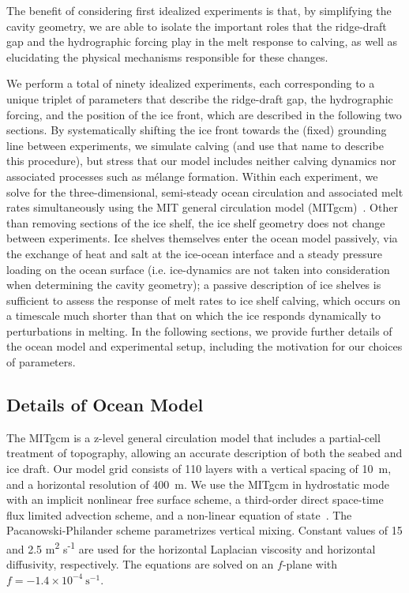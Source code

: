\documentclass[draft]{agujournal2019}
\begin{document}
The benefit of considering first idealized experiments is that, by simplifying the cavity geometry, we are able to isolate the important roles that the ridge-draft gap and the hydrographic forcing play in the melt response to calving, as well as elucidating the physical mechanisms responsible for these changes. 

We perform a total of ninety idealized experiments, each corresponding to a unique triplet of parameters that describe the ridge-draft gap, the hydrographic forcing, and the position of the ice front, which are described in the following two sections. By systematically shifting the ice front towards the (fixed) grounding line between experiments, we simulate calving (and use that name to describe this procedure), but stress that our model includes neither calving dynamics nor associated processes such as mélange formation. Within each experiment, we solve for the three-dimensional, semi-steady ocean circulation and associated melt rates simultaneously using the MIT general circulation model (MITgcm)~\cite{Marshall1997JGROceans}. Other than removing sections of the ice shelf, the ice shelf geometry does not change between experiments. Ice shelves themselves enter the ocean model passively, via the exchange of heat and salt at the ice-ocean interface and a steady pressure loading on the ocean surface (i.e. ice-dynamics are not taken into  consideration when determining the cavity geometry); a passive description of ice shelves is sufficient to assess the response of melt rates to ice shelf calving, which occurs on a timescale much shorter than that on which the ice responds dynamically to perturbations in melting. In the following sections, we provide further details of the ocean model and experimental setup, including the motivation for our choices of parameters.


\subsection{Details of Ocean Model}\label{S:Experiment:Model}
The MITgcm is a z-level general circulation model that includes a partial-cell treatment of topography, allowing an accurate description of both the seabed and ice draft. Our model grid consists of 110 layers with a vertical spacing of 10~m, and a horizontal resolution of 400~m. We use the MITgcm in hydrostatic mode with an implicit nonlinear free surface scheme, a third-order direct space-time flux limited advection scheme, and a non-linear equation of state~\cite{Mcdougall2003JAtmosOceanTech}. The Pacanowski-Philander \cite{Pacanowski1981JPhysOcean} scheme parametrizes vertical mixing. Constant values of 15 and 2.5 
m\textsuperscript{2} s\textsuperscript{-1} are used for the horizontal Laplacian viscosity and horizontal diffusivity, respectively. The equations are solved on an $f$-plane with $f = -1.4\times10^{-4}~\text{s}^{-1}$.
\end{document}
